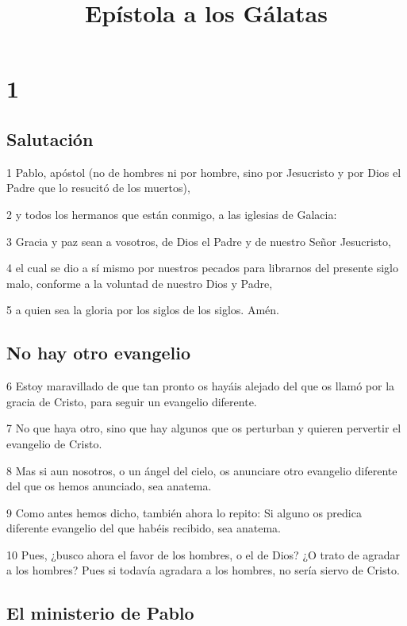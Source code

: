 
\title{Epístola a los Gálatas}

\chapter{1}

\section*{Salutación}

\par 1 Pablo, apóstol (no de hombres ni por hombre, sino por Jesucristo y por Dios el Padre que lo resucitó de los muertos),
\par 2 y todos los hermanos que están conmigo, a las iglesias de Galacia:
\par 3 Gracia y paz sean a vosotros, de Dios el Padre y de nuestro Señor Jesucristo,
\par 4 el cual se dio a sí mismo por nuestros pecados para librarnos del presente siglo malo, conforme a la voluntad de nuestro Dios y Padre,
\par 5 a quien sea la gloria por los siglos de los siglos. Amén.

\section*{No hay otro evangelio}

\par 6 Estoy maravillado de que tan pronto os hayáis alejado del que os llamó por la gracia de Cristo, para seguir un evangelio diferente.
\par 7 No que haya otro, sino que hay algunos que os perturban y quieren pervertir el evangelio de Cristo.
\par 8 Mas si aun nosotros, o un ángel del cielo, os anunciare otro evangelio diferente del que os hemos anunciado, sea anatema.
\par 9 Como antes hemos dicho, también ahora lo repito: Si alguno os predica diferente evangelio del que habéis recibido, sea anatema.
\par 10 Pues, ¿busco ahora el favor de los hombres, o el de Dios? ¿O trato de agradar a los hombres? Pues si todavía agradara a los hombres, no sería siervo de Cristo.

\section*{El ministerio de Pablo}


